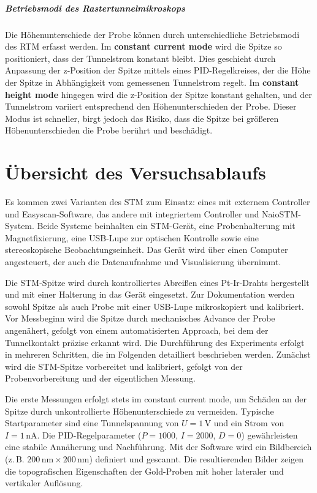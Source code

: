 \paragraph{Betriebsmodi des Rastertunnelmikroskops}

Die Höhenunterschiede der Probe können durch unterschiedliche Betriebsmodi des RTM erfasst werden. Im \textbf{constant current mode} wird die Spitze so positioniert, dass der Tunnelstrom konstant bleibt. Dies geschieht durch Anpassung der z-Position der Spitze mittels eines PID-Regelkreises, der die Höhe der Spitze in Abhängigkeit vom gemessenen Tunnelstrom regelt. Im \textbf{constant height mode} hingegen wird die z-Position der Spitze konstant gehalten, und der Tunnelstrom variiert entsprechend den Höhenunterschieden der Probe. Dieser Modus ist schneller, birgt jedoch das Risiko, dass die Spitze bei größeren Höhenunterschieden die Probe berührt und beschädigt.

\chapter{Übersicht des Versuchsablaufs}


Es kommen zwei Varianten des STM zum Einsatz: eines mit externem Controller und Easyscan-Software, das andere mit integriertem Controller und NaioSTM-System. Beide Systeme beinhalten ein STM-Gerät, eine Probenhalterung mit Magnetfixierung, eine USB-Lupe zur optischen Kontrolle sowie eine stereoskopische Beobachtungseinheit. Das Gerät wird über einen Computer angesteuert, der auch die Datenaufnahme und Visualisierung übernimmt.

Die STM-Spitze wird durch kontrolliertes Abreißen eines Pt-Ir-Drahts hergestellt und mit einer Halterung in das Gerät eingesetzt. Zur Dokumentation werden sowohl Spitze als auch Probe mit einer USB-Lupe mikroskopiert und kalibriert. Vor Messbeginn wird die Spitze durch mechanisches Advance der Probe angenähert, gefolgt von einem automatisierten Approach, bei dem der Tunnelkontakt präzise erkannt wird.
Die Durchführung des Experiments erfolgt in mehreren Schritten, die im Folgenden detailliert beschrieben werden. Zunächst wird die STM-Spitze vorbereitet und kalibriert, gefolgt von der Probenvorbereitung und der eigentlichen Messung.

Die erste Messungen erfolgt stets im constant current mode, um Schäden an der Spitze durch unkontrollierte Höhenunterschiede zu vermeiden. Typische Startparameter sind eine Tunnelspannung von $U = 1\,\text{V}$ und ein Strom von $I = 1\,\text{nA}$. Die PID-Regelparameter ($P = 1000$, $I = 2000$, $D = 0$) gewährleisten eine stabile Annäherung und Nachführung. Mit der Software wird ein Bildbereich (z.\,B. $200\,\text{nm} \times 200\,\text{nm}$) definiert und gescannt. Die resultierenden Bilder zeigen die topografischen Eigenschaften der Gold-Proben mit hoher lateraler und vertikaler Auflösung.

